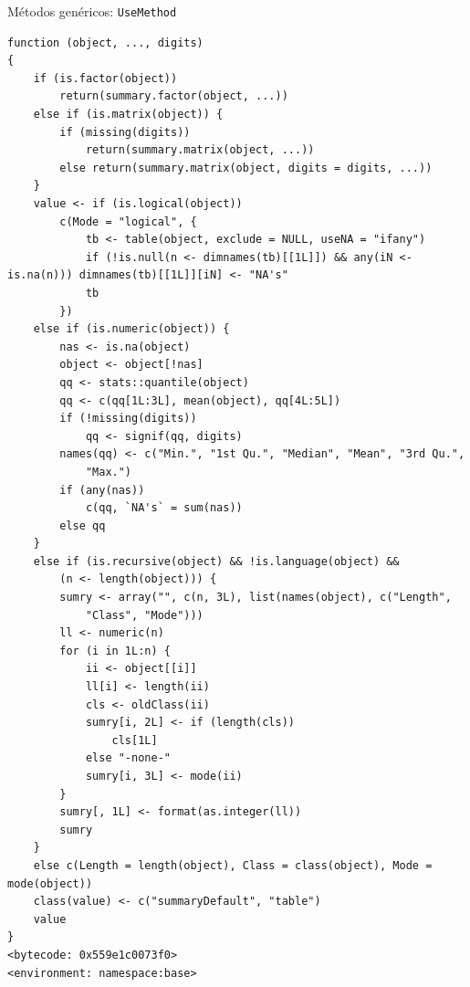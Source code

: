 \documentclass[xcolor={usenames,svgnames,dvipsnames}]{beamer}
\begin{document}
\begin{frame}[fragile,label={sec:org88f9d2c}]{Métodos genéricos: \texttt{UseMethod}}
\begin{verbatim}
function (object, ..., digits) 
{
    if (is.factor(object)) 
        return(summary.factor(object, ...))
    else if (is.matrix(object)) {
        if (missing(digits)) 
            return(summary.matrix(object, ...))
        else return(summary.matrix(object, digits = digits, ...))
    }
    value <- if (is.logical(object)) 
        c(Mode = "logical", {
            tb <- table(object, exclude = NULL, useNA = "ifany")
            if (!is.null(n <- dimnames(tb)[[1L]]) && any(iN <- is.na(n))) dimnames(tb)[[1L]][iN] <- "NA's"
            tb
        })
    else if (is.numeric(object)) {
        nas <- is.na(object)
        object <- object[!nas]
        qq <- stats::quantile(object)
        qq <- c(qq[1L:3L], mean(object), qq[4L:5L])
        if (!missing(digits)) 
            qq <- signif(qq, digits)
        names(qq) <- c("Min.", "1st Qu.", "Median", "Mean", "3rd Qu.", 
            "Max.")
        if (any(nas)) 
            c(qq, `NA's` = sum(nas))
        else qq
    }
    else if (is.recursive(object) && !is.language(object) && 
        (n <- length(object))) {
        sumry <- array("", c(n, 3L), list(names(object), c("Length", 
            "Class", "Mode")))
        ll <- numeric(n)
        for (i in 1L:n) {
            ii <- object[[i]]
            ll[i] <- length(ii)
            cls <- oldClass(ii)
            sumry[i, 2L] <- if (length(cls)) 
                cls[1L]
            else "-none-"
            sumry[i, 3L] <- mode(ii)
        }
        sumry[, 1L] <- format(as.integer(ll))
        sumry
    }
    else c(Length = length(object), Class = class(object), Mode = mode(object))
    class(value) <- c("summaryDefault", "table")
    value
}
<bytecode: 0x559e1c0073f0>
<environment: namespace:base>
\end{verbatim}
\end{frame}
\end{document}
